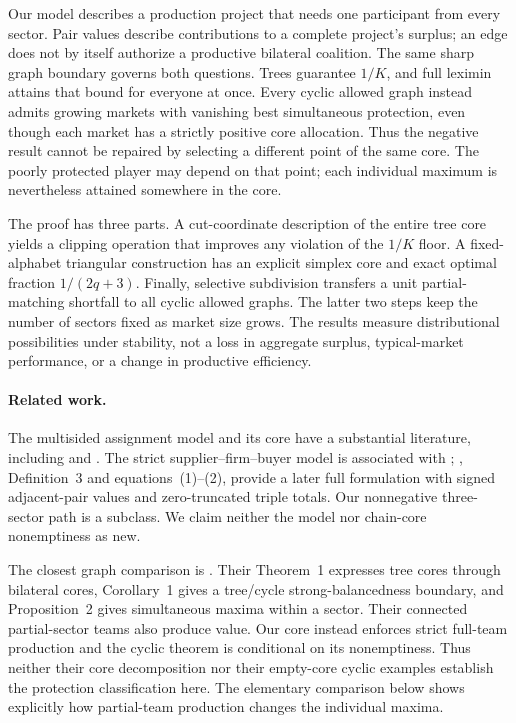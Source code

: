 \documentclass[11pt]{article}
\theoremstyle{remark}\newtheorem{remark}[theorem]{Remark}
\begin{document}
Our model describes a production project that needs one participant from
every sector. Pair values describe contributions to a complete project's
surplus; an edge does not by itself authorize a productive bilateral coalition.
The same sharp graph boundary governs both questions. Trees guarantee $1/K$,
and full leximin attains that bound for everyone at once. Every cyclic allowed
graph instead admits growing markets with vanishing best simultaneous
protection, even though each market has a strictly positive core allocation.
Thus the negative result cannot be repaired by selecting a different point
of the same core. The poorly protected player may depend on that point;
each individual maximum is nevertheless attained somewhere in the core.

The proof has three parts. A cut-coordinate description of the entire tree
core yields a clipping operation that improves any violation of the $1/K$
floor. A fixed-alphabet triangular construction has an explicit simplex core
and exact optimal fraction $1/(2q+3)$. Finally, selective subdivision transfers
a unit partial-matching shortfall to all cyclic allowed graphs. The latter two
steps keep the number of sectors fixed as market size grows. The results
measure distributional possibilities under stability, not a loss in aggregate
surplus, typical-market performance, or a change in productive efficiency.

\paragraph{Related work.}
The multisided assignment model and its core have a substantial literature,
including \citet{Quint1991} and \citet{Lucas1995}. The strict
supplier--firm--buyer model is associated with \citet{Stuart1997};
\citet{AtaySolymosi2018}, Definition~3 and equations~(1)--(2), provide a
later full formulation with signed adjacent-pair values and zero-truncated
triple totals. Our nonnegative three-sector path is a subclass. We claim
neither the model nor chain-core nonemptiness as new.

The closest graph comparison is \citet{AtayNunez2019}. Their Theorem~1
expresses tree cores through bilateral cores, Corollary~1 gives a tree/cycle
strong-balancedness boundary, and Proposition~2 gives simultaneous maxima
within a sector. Their connected partial-sector teams also produce value.
Our core instead enforces strict full-team production and the cyclic theorem
is conditional on its nonemptiness. Thus neither their core decomposition
nor their empty-core cyclic examples establish the protection classification
here. The elementary comparison below shows explicitly how partial-team
production changes the individual maxima.
\end{document}
